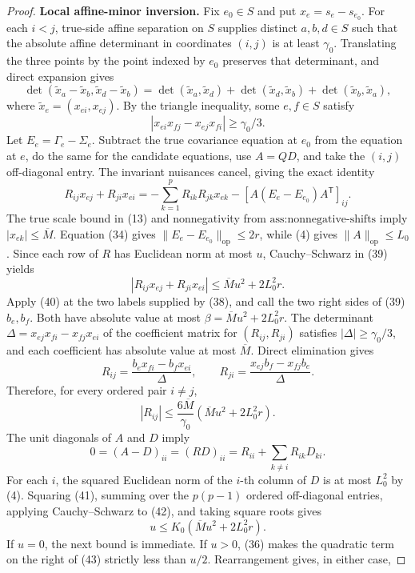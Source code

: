 \documentclass{article}
\begin{document}
\begin{proof}
\textbf{Local affine-minor inversion.}
Fix \(e_0\in S\) and put \(x_e=s_e-s_{e_0}\). For each \(i<j\), true-side affine separation on \(S\) supplies distinct \(a,b,d\in S\) such that the absolute affine determinant in coordinates \((i,j)\) is at least \(\gamma_0\). Translating the three points by the point indexed by \(e_0\) preserves that determinant, and direct expansion gives
\[
\det(\widetilde x_a-\widetilde x_b,
\widetilde x_d-\widetilde x_b)
=\det(\widetilde x_a,\widetilde x_d)
+\det(\widetilde x_d,\widetilde x_b)
+\det(\widetilde x_b,\widetilde x_a),
\tag{37}
\]
where \(\widetilde x_e=(x_{ei},x_{ej})\). By the triangle inequality, some \(e,f\in S\) satisfy
\[
|x_{ei}x_{fj}-x_{ej}x_{fi}|\geq\gamma_0/3.
\tag{38}
\]
Let \(E_e=\Gamma_e-\Sigma_e\). Subtract the true covariance equation at \(e_0\) from the equation at \(e\), do the same for the candidate equations, use \(A=QD\), and take the \((i,j)\) off-diagonal entry. The invariant nuisances cancel, giving the exact identity
\[
R_{ij}x_{ej}+R_{ji}x_{ei}
=-\sum_{k=1}^pR_{ik}R_{jk}x_{ek}
-[A(E_e-E_{e_0})A^{\mathsf T}]_{ij}.
\tag{39}
\]
The true scale bound in (13) and nonnegativity from \(\text{ass:nonnegative-shifts}\) imply \(|x_{ek}|\leq\overline M\). Equation (34) gives \(\|E_e-E_{e_0}\|_{\mathrm{op}}\leq2r\), while (4) gives \(\|A\|_{\mathrm{op}}\leq L_0\). Since each row of \(R\) has Euclidean norm at most \(u\), Cauchy--Schwarz in (39) yields
\[
|R_{ij}x_{ej}+R_{ji}x_{ei}|
\leq\overline M u^2+2L_0^2r.
\tag{40}
\]
Apply (40) at the two labels supplied by (38), and call the two right sides of (39) \(b_e,b_f\). Both have absolute value at most \(\beta=\overline M u^2+2L_0^2r\). The determinant \(\Delta=x_{ej}x_{fi}-x_{fj}x_{ei}\) of the coefficient matrix for \((R_{ij},R_{ji})\) satisfies \(|\Delta|\geq\gamma_0/3\), and each coefficient has absolute value at most \(\overline M\). Direct elimination gives
\[
R_{ij}=\frac{b_ex_{fi}-b_fx_{ei}}{\Delta},
\qquad
R_{ji}=\frac{x_{ej}b_f-x_{fj}b_e}{\Delta}.
\]
Therefore, for every ordered pair \(i\ne j\),
\[
|R_{ij}|
\leq\frac{6\overline M}{\gamma_0}
\left(\overline M u^2+2L_0^2r\right).
\tag{41}
\]
The unit diagonals of \(A\) and \(D\) imply
\[
0=(A-D)_{ii}=(RD)_{ii}
=R_{ii}+\sum_{k\ne i}R_{ik}D_{ki}.
\tag{42}
\]
For each \(i\), the squared Euclidean norm of the \(i\)-th column of \(D\) is at most \(L_0^2\) by (4). Squaring (41), summing over the \(p(p-1)\) ordered off-diagonal entries, applying Cauchy--Schwarz to (42), and taking square roots gives
\[
u\leq K_0\left(\overline M u^2+2L_0^2r\right).
\tag{43}
\]
If \(u=0\), the next bound is immediate. If \(u>0\), (36) makes the quadratic term on the right of (43) strictly less than \(u/2\). Rearrangement gives, in either case,

\end{proof}
\end{document}
